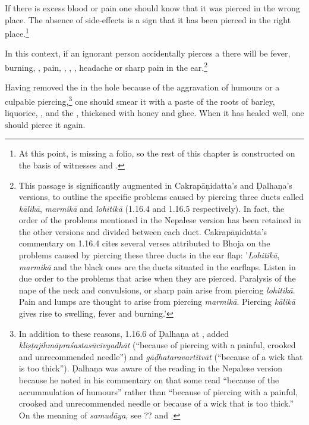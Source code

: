 \begin{translation}
    \item [3]  If there is excess blood or pain one should know that it was pierced
    in the wrong place. The absence of side-effects is a sign that it has been pierced 
    in the right place.\footnote{At this point,  is missing a folio, so the rest of this chapter
    is constructed on the basis of witnesses  and 
    .}
    
    \item [4] In this context, if an ignorant person accidentally pierces a
 there will be fever, burning, , pain,
, ,
, headache or sharp pain in the ear.\footnote{This
passage is significantly augmented in Cakrapāṇidatta's and Ḍalhaṇa's versions,
to outline the specific problems caused by piercing three ducts called
\emph{kālikā}, \emph{marmikā} and \emph{lohitikā} (1.16.4
\citep[126]{acar-1939} and 1.16.5 \citep[77]{vulgate} respectively). In fact,
the order of the problems mentioned in the Nepalese version has been retained
in the other versions and divided between each duct. Cakrapāṇidatta's
commentary on 1.16.4 \citep[126]{acar-1939} cites several verses attributed to
Bhoja on the problems caused by piercing these three ducts in the ear flap:
'\emph{Lohitikā}, \emph{marmikā} and the black ones are the ducts situated in
the earflaps.  Listen in due order to the problems that arise when they are
pierced. Paralysis of the nape of the neck and convulsions, or sharp pain
arise from piercing \emph{lohitikā}. Pain and lumps are thought to arise from
piercing \emph{marmikā}. Piercing \emph{kālikā} gives rise to swelling, fever
and burning.'}
    
    \item[5]     Having removed the  in the hole because of the
aggravation of humours or a culpable piercing,\footnote{In addition to these
reasons, 1.16.6 of Ḍalhaṇa at , added
\emph{kliṣṭajihmāpraśastasūcīvyadhāt} (“because of piercing with a painful,
crooked and unrecommended needle”) and \emph{gāḍhataravartitvāt} (“because of
a wick that is too thick”). Ḍalhaṇa was aware of the reading in the Nepalese
version because he noted in his commentary on  that some read
“because of the accummulation of humours” rather than “because of piercing
with a painful, crooked and unrecommended needle or because of a wick that is
too thick.” On the meaning of \emph{samudāya}, see ?? and
\cite[1–5]{meul-1992}.}
one should smear it with a paste of the roots of barley, liquorice,
, and the ,
thickened with honey and ghee. When it has healed well, one should pierce it
again.
    

\end{translation}
